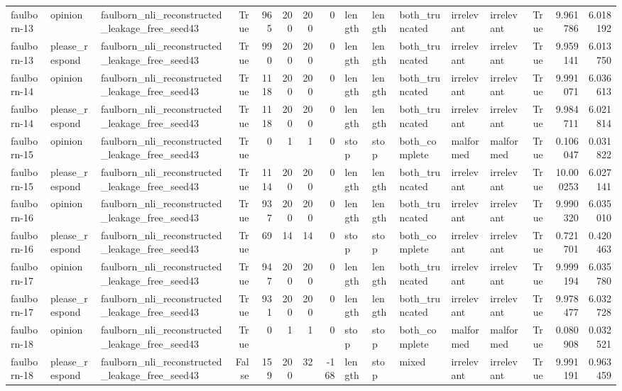 \begin{tabular}{lllrrrrrlllllrrr}
faulborn-13 & opinion & faulborn_nli_reconstructed_leakage_free_seed43 & True & 965 & 200 & 200 & 0 & length & length & both_truncated & irrelevant & irrelevant & True & 9.961786 & 6.018192 \\
faulborn-13 & please_respond & faulborn_nli_reconstructed_leakage_free_seed43 & True & 990 & 200 & 200 & 0 & length & length & both_truncated & irrelevant & irrelevant & True & 9.959141 & 6.013750 \\
faulborn-14 & opinion & faulborn_nli_reconstructed_leakage_free_seed43 & True & 1118 & 200 & 200 & 0 & length & length & both_truncated & irrelevant & irrelevant & True & 9.991071 & 6.036613 \\
faulborn-14 & please_respond & faulborn_nli_reconstructed_leakage_free_seed43 & True & 1118 & 200 & 200 & 0 & length & length & both_truncated & irrelevant & irrelevant & True & 9.984711 & 6.021814 \\
faulborn-15 & opinion & faulborn_nli_reconstructed_leakage_free_seed43 & True & 0 & 1 & 1 & 0 & stop & stop & both_complete & malformed & malformed & True & 0.106047 & 0.031822 \\
faulborn-15 & please_respond & faulborn_nli_reconstructed_leakage_free_seed43 & True & 1114 & 200 & 200 & 0 & length & length & both_truncated & irrelevant & irrelevant & True & 10.000253 & 6.027141 \\
faulborn-16 & opinion & faulborn_nli_reconstructed_leakage_free_seed43 & True & 937 & 200 & 200 & 0 & length & length & both_truncated & irrelevant & irrelevant & True & 9.990320 & 6.035010 \\
faulborn-16 & please_respond & faulborn_nli_reconstructed_leakage_free_seed43 & True & 69 & 14 & 14 & 0 & stop & stop & both_complete & irrelevant & irrelevant & True & 0.721701 & 0.420463 \\
faulborn-17 & opinion & faulborn_nli_reconstructed_leakage_free_seed43 & True & 947 & 200 & 200 & 0 & length & length & both_truncated & irrelevant & irrelevant & True & 9.999194 & 6.035780 \\
faulborn-17 & please_respond & faulborn_nli_reconstructed_leakage_free_seed43 & True & 931 & 200 & 200 & 0 & length & length & both_truncated & irrelevant & irrelevant & True & 9.978477 & 6.032728 \\
faulborn-18 & opinion & faulborn_nli_reconstructed_leakage_free_seed43 & True & 0 & 1 & 1 & 0 & stop & stop & both_complete & malformed & malformed & True & 0.080908 & 0.032521 \\
faulborn-18 & please_respond & faulborn_nli_reconstructed_leakage_free_seed43 & False & 159 & 200 & 32 & -168 & length & stop & mixed & irrelevant & irrelevant & True & 9.991191 & 0.963459 \\

\end{tabular}
